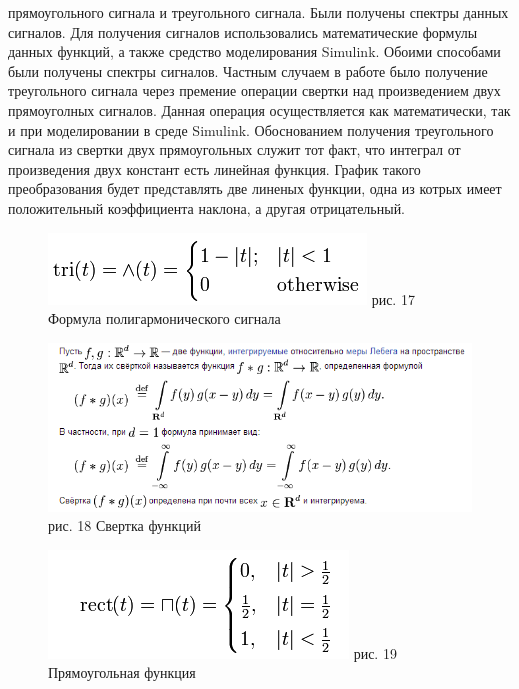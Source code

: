 \documentclass[10pt,a4paper]{report}
\begin{document}
 прямоугольного сигнала и треугольного сигнала. Были получены спектры данных сигналов. Для получения сигналов использовались математические формулы данных функций, а также средство моделирования Simulink. Обоими способами были получены спектры сигналов. Частным случаем в работе было получение треугольного сигнала через премение операции свертки над произведением двух прямоуголных сигналов. Данная операция осуществляется как математически, так и при моделировании в среде Simulink.
Обоснованием получения треугольного сигнала из свертки двух прямоугольных служит тот факт, что интеграл от произведения двух констант есть линейная функция. График такого преобразования будет представлять две линеных функции, одна из котрых имеет положительный коэффициента наклона, а другая отрицательный.
\begin{figure}
\begin{center}
\includegraphics[angle=0, scale = 0.8]{17.png}\newline
рис. 17    Формула полигармонического сигнала\newline
\end{center}
\end{figure}
\begin{figure}
\begin{center}
\includegraphics[angle=0, scale = 0.8]{18.png}\newline
рис. 18   Свертка функций
\end{center}
\end{figure}
\begin{figure}
\begin{center}
\includegraphics[angle=0, scale = 0.8]{19.png}\newline
рис. 19    Прямоугольная функция
\end{center}
\end{figure}
\end{document}
